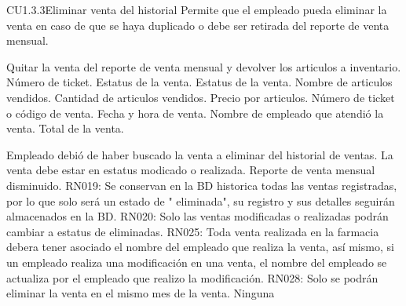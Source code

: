 \begin{UseCase} {CU1.3.3}{Eliminar venta del historial}{
	Permite que el empleado pueda eliminar la venta en caso de que
	se haya duplicado o debe ser retirada del reporte de venta mensual.
}








	
	{
	}
	{
		Quitar la venta del reporte de venta mensual y devolver los articulos a inventario.
	}
	{
		\UCli Número de ticket.
		\UCli Estatus de la venta.
	}
	{
		\UCli Estatus de la venta.
		\UCli Nombre de articulos vendidos.
		\UCli Cantidad de articulos vendidos.
		\UCli Precio por articulos.
		\UCli Número de ticket o código de venta.
		\UCli Fecha y hora de venta.
		\UCli Nombre de empleado que atendió la venta.
		\UCli Total de la venta.
	}

	{
		\UCli Empleado debió de haber buscado la venta a eliminar del historial de ventas.
		\UCli La venta debe estar en estatus modicado o realizada.
	}
	{
		\UCli Reporte de venta mensual disminuido.
	}
	{
		\UCli RN019: Se conservan en la BD historica todas las ventas registradas, por lo que solo será un estado de " eliminada", su registro y sus detalles seguirán almacenados en la BD.
		\UCli RN020: Solo las ventas modificadas o realizadas podrán cambiar a estatus de eliminadas.
		\UCli RN025: Toda venta realizada en la farmacia debera tener asociado el nombre del empleado que realiza la venta, así mismo, si un empleado realiza una modificación en una venta, el nombre del empleado se actualiza por el empleado que realizo la modificación.
\UCli RN028: Solo se podrán eliminar la venta en el mismo mes de la venta.
	}
	{
		Ninguna
	}
\end{UseCase}

